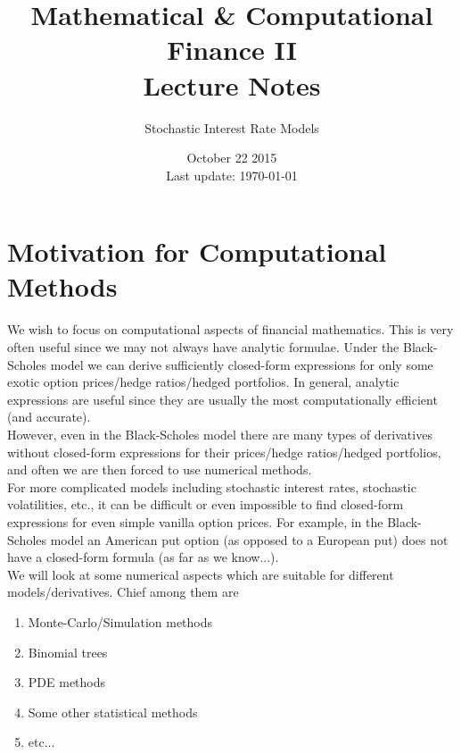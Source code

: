 \documentclass[12pt]{article}
\newlength\tindent
\renewcommand{\indent}{\hspace*{\tindent}}
\begin{document}
 
 
\title{Mathematical \& Computational Finance II\\Lecture Notes}
\author{Stochastic Interest Rate Models}
\date{October 22 2015 \\ Last update: \today{}}
\maketitle

\section{Motivation for Computational Methods}

\indent We wish to focus on computational aspects of financial mathematics. This is very often useful since we may not always have analytic formulae. Under the Black-Scholes model we can derive sufficiently closed-form expressions for only some exotic option prices/hedge ratios/hedged portfolios. In general, analytic expressions are useful since they are usually the most computationally efficient (and accurate). \\

\indent However, even in the Black-Scholes model there are many types of derivatives without closed-form expressions for their prices/hedge ratios/hedged portfolios, and often we are then forced to use numerical methods. \\

\indent For more complicated models including stochastic interest rates, stochastic volatilities, etc., it can be difficult or even impossible to find closed-form expressions for even simple vanilla option prices. For example, in the Black-Scholes model an American put option (as opposed to a European put) does not have a closed-form formula (as far as we know...). \\

\indent We will look at some numerical aspects which are suitable for different models/derivatives. Chief among them are
\begin{enumerate}
	\item Monte-Carlo/Simulation methods
	\item Binomial trees 
	\item PDE methods
	\item Some other statistical methods
	\item etc...
\end{enumerate}
\end{document}
